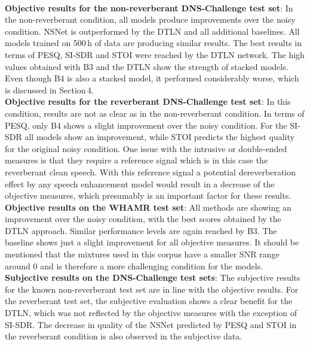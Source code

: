 \documentclass[a4paper]{article}
\begin{document}
\\
\textbf{Objective results for the non-reverberant DNS-Challenge test set}: In the non-reverberant condition, all models produce improvements over the noisy condition. 
NSNet is outperformed 
by the DTLN and all additional baselines. 
All models trained on 500\,h of data are producing similar results. The best results in terms of PESQ, SI-SDR and STOI were reached by the DTLN network. 
The high values obtained with B3 and the DTLN show the strength of stacked models. Even though B4 is also a stacked model, it performed considerably worse, which is discussed in Section\,4. 
\\
\textbf{Objective results for the reverberant DNS-Challenge test set}: In this condition, results are not as clear as in the non-reverberant condition. 
In terms of PESQ, only B4 shows a slight improvement over the noisy condition. 
For the SI-SDR all models show an improvement, while STOI predicts the highest quality for the original noisy condition. 
One issue with the intrusive or double-ended measures is that they require a reference signal which is in this case the reverberant clean speech.
With this reference signal a potential dereverberation effect by any speech enhancement model would result in a decrease of the objective measures, which presumably is an important factor for these results. 
\\
\textbf{Objective results on the WHAMR test set}: All methods are showing an improvement over the noisy condition, with the best scores obtained by the DTLN approach. 
Similar performance levels are again reached by B3. The baseline shows just a slight improvement for all objective measures. It should be mentioned that the mixtures used in this corpus have a smaller SNR range around 0 and is therefore a more challenging condition for the models. 
\\
\textbf{Subjective results on the DNS-Challenge test sets}:
The subjective results for the known non-reverberant test set are in line with the objective results. 
For the reverberant test set, the subjective evaluation shows a clear benefit for the DTLN, which was not reflected by the objective measures with the exception of  SI-SDR. 
The decrease in quality of the NSNet predicted by PESQ and STOI in the reverberant condition is also observed in the subjective data. 
\end{document}
